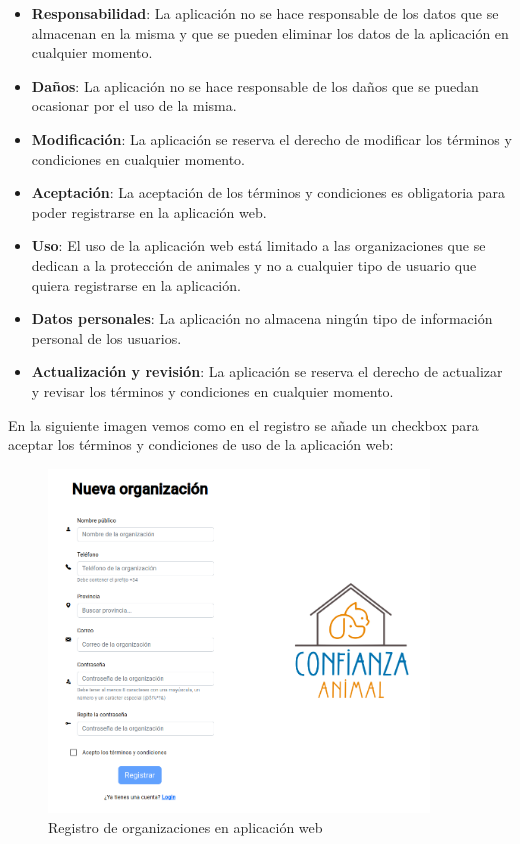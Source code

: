 \begin{itemize}
    \item \textbf{Responsabilidad}: La aplicación no se hace responsable de los datos que se almacenan en la misma y que
    se pueden eliminar los datos de la aplicación en cualquier momento.
    \item \textbf{Daños}: La aplicación no se hace responsable de los daños que se puedan ocasionar por el uso de la misma.
    \item \textbf{Modificación}: La aplicación se reserva el derecho de modificar los términos y condiciones en cualquier
    momento.
    \item \textbf{Aceptación}: La aceptación de los términos y condiciones es obligatoria para poder registrarse en la
    aplicación web.
    \item \textbf{Uso}: El uso de la aplicación web está limitado a las organizaciones que se dedican a la protección de
    animales y no a cualquier tipo de usuario que quiera registrarse en la aplicación.
    \item \textbf{Datos personales}: La aplicación no almacena ningún tipo de información personal de los usuarios.
    \item \textbf{Actualización y revisión}: La aplicación se reserva el derecho de actualizar y revisar los términos y
    condiciones en cualquier momento.
\end{itemize}

En la siguiente imagen vemos como en el registro se añade un checkbox para aceptar los términos y condiciones de uso de
la aplicación web: \\

\begin{figure}[H]
    \centering
    \includegraphics[width=0.9\textwidth]{imgs/registro.png}
    \caption{Registro de organizaciones en aplicación web}
    \label{fig:terminos-y-condiciones}
\end{figure}